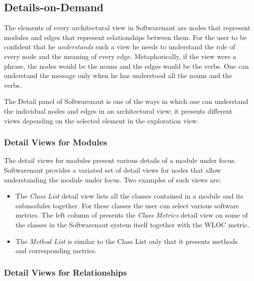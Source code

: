 \documentclass[preprint,12pt]{elsarticle}
\begin{document}
\subsection {Details-on-Demand} 

The elements of every architectural view in Softwarenaut are nodes that represent modules and edges that represent relationships between them. For the user to be confident that he {\em understands} such a view he needs to understand the role of every node and the meaning of every edge. Metaphorically, if the view were a phrase, the nodes would be the nouns and the edges would be the verbs. One can understand the message only when he has understood all the nouns and the verbs.

The Detail panel of Softwarenaut is one of the ways in which one can understand the individual nodes and edges in an architectural view; it presents different views depending on the selected element in the exploration view. 

\subsubsection {Detail Views for Modules}

The detail views for modules present various details of a module under focus. Softwarenaut provides a variated set of detail views for nodes that allow understanding the module under focus. Two examples of such views are: 

\begin{itemize}
\item The {\em Class List} detail view lists all the classes contained in a module and its submodules together. For these classes the user can select various software metrics. The left column of  presents the {\em Class Metrics} detail view on some of the classes in the Softwarenaut system itself together with the WLOC metric.
\item The {\em Method List} is similar to the Class List only that it presents methods and corresponding metrics. 

\end{itemize}

\subsubsection {Detail Views for Relationships}
\end{document}
